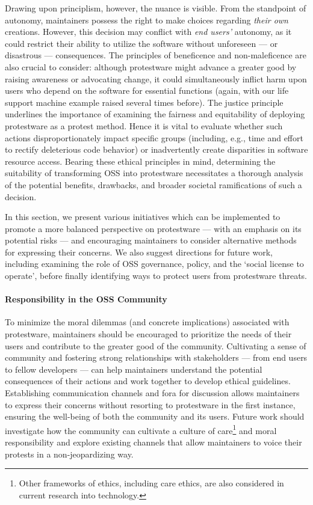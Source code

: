 \documentclass[journal,twocolumn]{IEEEtran}
\begin{document}
Drawing upon principlism, however, the nuance is visible. From the standpoint of autonomy, maintainers possess the right to make choices regarding \textit{their own} creations. However, this decision may conflict with \textit{end users'} autonomy, as it could restrict their ability to utilize the software without unforeseen --- or disastrous --- consequences. The principles of beneficence and non-maleficence are also crucial to consider: although protestware might advance a greater good by raising awareness or advocating change, it could simultaneously inflict harm upon users who depend on the software for essential functions (again, with our life support machine example raised several times before). The justice principle underlines the importance of examining the fairness and equitability of deploying protestware as a protest method. Hence it is vital to evaluate whether such actions disproportionately impact specific groups (including, e.g., time and effort to rectify deleterious code behavior) or inadvertently create disparities in software resource access. Bearing these ethical principles in mind, determining the suitability of transforming OSS into protestware necessitates a thorough analysis of the potential benefits, drawbacks, and broader societal ramifications of such a decision.

In this section, we present various initiatives which can be implemented to promote a more balanced perspective on protestware --- with an emphasis on its potential risks --- and encouraging maintainers to consider alternative methods for expressing their concerns. We also suggest directions for future work, including examining the role of OSS governance, policy, and the `social license to operate', before finally identifying ways to protect users from protestware threats.

\paragraph{Responsibility in the OSS Community}
To minimize the moral dilemmas (and concrete implications) associated with protestware, maintainers should be encouraged to prioritize the needs of their users and contribute to the greater good of the community. Cultivating a sense of community and fostering strong relationships with stakeholders --- from end users to fellow developers --- can help maintainers understand the potential consequences of their actions and work together to develop ethical guidelines. Establishing communication channels and fora for discussion allows maintainers to express their concerns without resorting to protestware in the first instance, ensuring the well-being of both the community and its users. Future work should investigate how the community can cultivate a culture of care\footnote{Other frameworks of ethics, including care ethics, are also considered in current research into technology.} and moral responsibility and explore existing channels that allow maintainers to voice their protests in a non-jeopardizing way.
\end{document}
